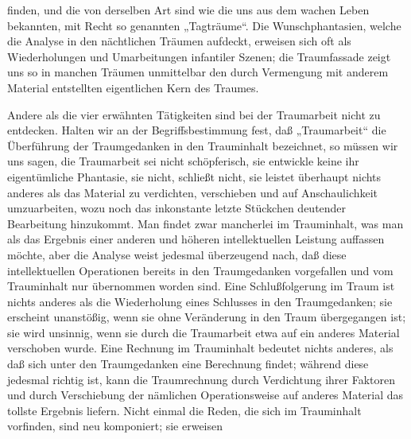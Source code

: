 \documentclass{article}
\begin{document}
         
            
            
            
        \pstart
        finden, und die von derselben Art sind wie die uns aus dem wachen
               Leben bekannten, mit Recht so genannten „Tagträume“. Die Wunschphantasien,
               welche die Analyse in den nächtlichen Träumen aufdeckt, erweisen sich oft als
               Wiederholungen und Umarbeitungen infantiler Szenen; die Traumfassade zeigt uns
               so in manchen Träumen unmittelbar den durch Vermengung mit anderem Material
               entstellten eigentlichen Kern des Traumes.
        \pend
    
            
        \pstart
        Andere als die vier erwähnten Tätigkeiten sind bei der Traumarbeit
               nicht zu entdecken. Halten wir an der Begriffsbestimmung fest, daß „Traumarbeit“
               die Überführung der Traumgedanken in den Trauminhalt bezeichnet, so müssen wir
               uns sagen, die Traumarbeit sei nicht schöpferisch, sie entwickle
               keine ihr eigentümliche Phantasie, sie 
     nicht, schließt nicht, sie leistet überhaupt nichts anderes als das
               Material zu verdichten, verschieben und auf Anschaulichkeit umzuarbeiten, wozu
               noch das inkonstante letzte Stückchen deutender Bearbeitung hinzukommt. Man
               findet zwar mancherlei im Trauminhalt, was man als das Ergebnis einer
               anderen und höheren intellektuellen Leistung auffassen möchte, aber die Analyse
               weist jedesmal überzeugend nach, daß
               diese intellektuellen Operationen bereits in den
                  Traumgedanken vorgefallen und vom Trauminhalt nur übernommen worden sind.
               Eine Schlußfolgerung im Traum ist nichts anderes als die Wiederholung eines
               Schlusses in den Traumgedanken; sie erscheint unanstößig, wenn sie ohne
               Veränderung in den Traum übergegangen ist; sie wird unsinnig, wenn sie durch die
               Traumarbeit etwa auf ein anderes Material verschoben wurde. Eine Rechnung im
               Trauminhalt bedeutet nichts anderes, als daß sich unter den Traumgedanken eine
               Berechnung findet; während diese jedesmal richtig ist, kann die Traumrechnung durch Verdichtung ihrer Faktoren und durch Verschiebung der nämlichen Operationsweise auf anderes Material das tollste
               Ergebnis liefern. Nicht einmal die Reden, die sich im Trauminhalt vorfinden,
               sind neu komponiert; sie erweisen
        \pend
    
\end{document}

